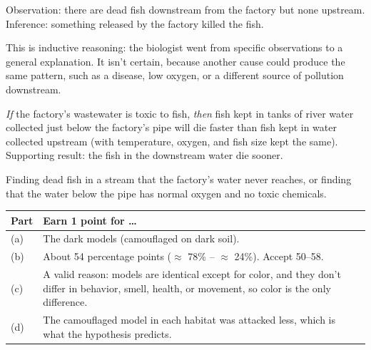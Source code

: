 \documentclass[11pt,letterpaper]{article}
\begin{document}
\modelanswer
\begin{parts}
  \item Observation: there are dead fish downstream from the factory but none upstream. Inference: something released by the factory killed the fish.
  \item This is inductive reasoning: the biologist went from specific observations to a general explanation. It isn't certain, because another cause could produce the same pattern, such as a disease, low oxygen, or a different source of pollution downstream.
  \item \emph{If} the factory's wastewater is toxic to fish, \emph{then} fish kept in tanks of river water collected just below the factory's pipe will die faster than fish kept in water collected upstream (with temperature, oxygen, and fish size kept the same). Supporting result: the fish in the downstream water die sooner.
  \item Finding dead fish in a stream that the factory's water never reaches, or finding that the water below the pipe has normal oxygen and no toxic chemicals.
\end{parts}


\begin{center}
\begin{tabularx}{\linewidth}{@{}lY@{}}
\toprule
Part & Earn 1 point for \dots{} \\
\midrule
(a) & The dark models (camouflaged on dark soil). \\
(b) & About 54 percentage points ($\approx$ 78\% -- $\approx$ 24\%). Accept 50–58. \\
(c) & A valid reason: models are identical except for color, and they don't differ in behavior, smell, health, or movement, so color is the only difference. \\
(d) & The camouflaged model in each habitat was attacked less, which is what the hypothesis predicts. \\
\bottomrule
\end{tabularx}
\end{center}
\end{document}
